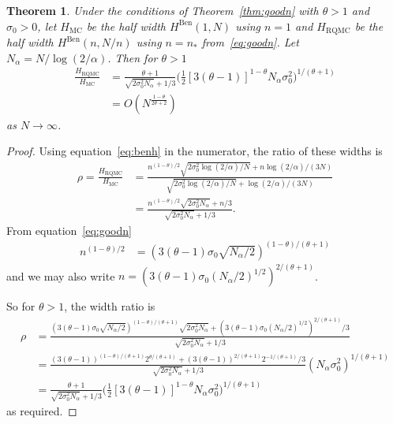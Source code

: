 \documentclass{article}
\newtheorem{theorem}{Theorem}
\newcommand{\art}[1]{\begingroup\color{blue}#1\endgroup}
\newcommand{\ben}{\mathrm{Ben}}
\newcommand{\mc}{\mathrm{MC}}
\newcommand{\rqmc}{\mathrm{RQMC}}
\begin{document}
\begin{theorem}
Under the conditions of Theorem~\ref{thm:goodn}
with $\theta>1$ and $\sigma_0>0$, 
let $H_{\mc}$ be the half width $H^\ben(1,N)$ using $n=1$
and $H_{\rqmc}$ be the half width $H^\ben(n,N/n)$ using
$n=n_*$ from~\eqref{eq:goodn}. 
Let $N_\alpha=N/\log(2/\alpha)$.
Then for $\theta>1$
\begin{align*}
\frac{H_\rqmc}{H_\mc} 
&= 
\frac{\theta+1}
{\sqrt{{2\sigma^2_0N_\alpha}}+1/3}
\biggl(\frac12
[{3(\theta-1)}]^{1-\theta}
N_\alpha\sigma_0^2\biggr)^{1/(\theta+1)}\\
&=O( N^{\frac{1-\theta}{2\theta+2}})
\end{align*}
as $N\to\infty$.
\end{theorem}
\begin{proof}
Using equation~\eqref{eq:benh} in the numerator,
the ratio of these widths is
\begin{align*}
\rho=
\frac{H_\rqmc}{H_\mc}
&=
\frac{n^{(1-\theta)/2}\sqrt{2\sigma^2_0\log(2/\alpha)/N}+n\log(2/\alpha)/(3N)}
{\sqrt{{2\sigma^2_0\log(2/\alpha)}/N}+\log(2/\alpha)/(3N)}\\
&=
\frac{n^{(1-\theta)/2}\sqrt{2\sigma^2_0N_\alpha}+n/3}
{\sqrt{{2\sigma^2_0N_\alpha}}+1/3}.
\end{align*}
From equation~\eqref{eq:goodn}
\begin{align*}
n^{(1-\theta)/2}
&=({3(\theta-1)\sigma_0\sqrt{N_\alpha/2}})^{(1-\theta)/(\theta+1)}
\end{align*}
and we may also write
$n=(3(\theta-1)\sigma_0(N_\alpha/2)^{1/2})^{2/(\theta+1)}$.

So for $\theta>1$, the width ratio is
\begin{align*}
\rho&=
\frac{({3(\theta-1)\sigma_0\sqrt{N_\alpha/2}})^{(1-\theta)/(\theta+1)}\sqrt{2\sigma^2_0N_\alpha}
+(3(\theta-1)\sigma_0(N_\alpha/2)^{1/2})^{2/(\theta+1)}/3}
{\sqrt{{2\sigma^2_0N_\alpha}}+1/3}\\
&=\frac{({3(\theta-1)})^{(1-\theta)/(\theta+1)}2^{\theta/(\theta+1)}
+(3(\theta-1))^{2/(\theta+1)}2^{-1/(\theta+1)}/3}
{\sqrt{{2\sigma^2_0N_\alpha}}+1/3}(N_\alpha\sigma_0^2)^{1/(\theta+1)}\\
&=\frac{\theta+1}
{\sqrt{{2\sigma^2_0N_\alpha}}+1/3}
\biggl(\frac12
[{3(\theta-1)}]^{1-\theta}
N_\alpha\sigma_0^2\biggr)^{1/(\theta+1)}
\end{align*}
as required.
\end{proof}
\end{document}
